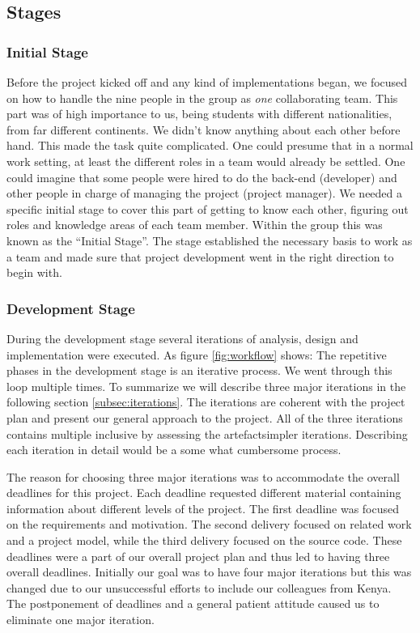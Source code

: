 \subsection{Stages} \label{subsec:stages}

\subsubsection{Initial Stage}
Before the project kicked off and any kind of implementations began, we focused on how to handle the nine people in the group as \textit{one} collaborating team. 
This part was of high importance to us, being students with different nationalities, from far different continents. We didn't know anything about each other before hand. This made the task quite complicated. One could presume that in a normal work setting, at least the different roles in a team would already be settled. One could imagine that some people were hired to do the back-end (developer) and other people in charge of managing the project (project manager). 
We needed a specific initial stage to cover this part of getting to know each other, figuring out roles and knowledge areas of each team member. Within the group this was known as the ``Initial Stage''. The stage established the necessary basis to work as a team and made sure that project development went in the right direction to begin with.

\subsubsection{Development Stage}
During the development stage several iterations of analysis, design and implementation were executed. As figure \ref{fig:workflow} shows: The repetitive phases in the development stage is an iterative process. We went through this loop multiple times. To summarize we will describe three major iterations in the following section \ref{subsec:iterations}. 
The iterations are coherent with the project plan and present our general approach to the project. All of the three iterations contains multiple inclusive \textemdash by assessing the artefact\textemdash simpler iterations. Describing each iteration in detail would be a some what cumbersome process.

The reason for choosing three major iterations was to accommodate the overall deadlines for this project. Each deadline requested different material containing information about different levels of the project. The first deadline was focused on the requirements and motivation. The second delivery focused on related work and a project model, while the third delivery focused on the source code. These deadlines were a part of our overall project plan and thus led to having three overall deadlines. Initially our goal was to have four major iterations but this was changed due to our unsuccessful efforts to include our colleagues from Kenya. The postponement of deadlines and a general patient attitude caused us to eliminate one major iteration. 

